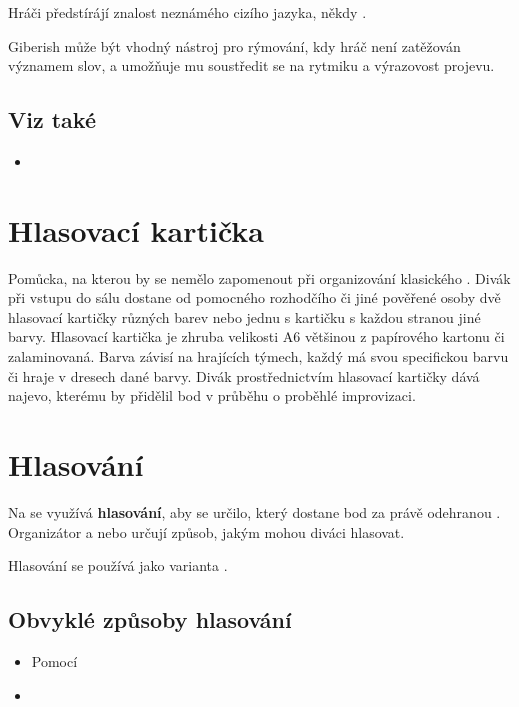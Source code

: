 Hráči předstírájí  znalost neznámého cizího jazyka, někdy . 
 
Giberish může být vhodný nástroj pro rýmování, kdy hráč není zatěžován významem slov, a umožňuje mu soustředit se na rytmiku a výrazovost projevu. 
 
\subsection{Viz také} \begin{itemize}
\item {}
\end{itemize}
 
 
\needspace{5cm} \section{Hlasovací kartička} \label{hlasovací kartička}  
 
Pomůcka, na kterou by se nemělo zapomenout při organizování klasického . Divák při vstupu do sálu dostane od pomocného rozhodčího či jiné pověřené osoby dvě hlasovací kartičky různých barev nebo jednu s kartičku s každou stranou jiné barvy. Hlasovací kartička je zhruba velikosti A6 většinou z papírového kartonu či zalaminovaná. Barva závisí na hrajících týmech, každý  má svou specifickou barvu či hraje v dresech dané barvy. Divák prostřednictvím hlasovací kartičky dává najevo, kterému  by přidělil bod v průběhu  o proběhlé improvizaci. 
 
 
\needspace{5cm} \section{Hlasování} \label{hlasování} Na  se využívá \textbf{hlasování}{}, aby se určilo, který  dostane bod za právě odehranou . Organizátor a nebo  určují způsob, jakým mohou diváci hlasovat. 
 
Hlasování se používá jako varianta . 
 
\subsection{ Obvyklé způsoby hlasování } \begin{itemize}
\item  Pomocí 
\item  {}
\end{itemize}
 

